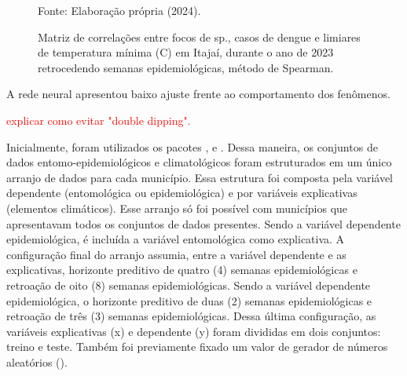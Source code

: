 \documentclass[
	12pt,				%
	openright,			%
	oneside,			%
	a4paper,			%
	english,			%
	french,				%
	spanish,			%
	brazil				%
	dvipsnames, table]{abntex2}
\begin{document}
\begin{figure}[htbp]
    \begin{center}
    \caption{Matriz de correlações entre focos de  sp., casos de dengue e limiares de temperatura mínima (C) em Itajaí, durante o ano de 2023 retrocedendo semanas epidemiológicas, método de Spearman.}
    \label{fig: matriz_corr_LIMtmin_ITA}
        \hfill
    \end{center}
    \small{Fonte: Elaboração própria (2024).}
\end{figure}



\newpage

\indent A rede neural apresentou baixo ajuste frente ao comportamento dos fenômenos.

\indent \textcolor{red}{explicar como evitar "double dipping".}



\indent Inicialmente, foram utilizados os pacotes ,  e  \cite{scikit-learn_2011_pedregosa, sklearn_2013_buitinck}. Dessa maneira, os conjuntos de dados entomo-epidemiológicos e climatológicos foram estruturados em um único arranjo de dados para cada município. Essa estrutura foi composta pela variável dependente (entomológica ou epidemiológica) e por variáveis explicativas (elementos climáticos). Esse arranjo só foi possível com municípios que apresentavam todos os conjuntos de dados presentes. Sendo a variável dependente epidemiológica, é incluída a variável entomológica como explicativa. A configuração final do arranjo assumia, entre a variável dependente e as explicativas, horizonte preditivo de quatro (4) semanas epidemiológicas e retroação de oito (8) semanas epidemiológicas. Sendo a variável dependente epidemiológica, o horizonte preditivo de duas (2) semanas epidemiológicas e retroação de três (3) semanas epidemiológicas. Dessa última configuração, as variáveis explicativas (x) e dependente (y) foram divididas em dois conjuntos: treino e teste. Também foi previamente fixado um valor de gerador de números aleatórios ().
\end{document}
